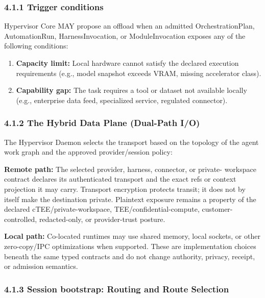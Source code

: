 \documentclass[
  11pt,
]{article}
\providecommand{\tightlist}{%
  \setlength{\itemsep}{0pt}\setlength{\parskip}{0pt}}
\begin{document}
\hypertarget{trigger-conditions}{%
\subsubsection{4.1.1 Trigger conditions}\label{trigger-conditions}}

Hypervisor Core MAY propose an offload when an admitted OrchestrationPlan,
AutomationRun, HarnessInvocation, or ModuleInvocation exposes any of the
following conditions:

\begin{enumerate}
\def\labelenumi{\arabic{enumi}.}
\tightlist
\item
  \textbf{Capacity limit:} Local hardware cannot satisfy the declared
  execution requirements (e.g., model snapshot exceeds VRAM, missing
  accelerator class).
\item
  \textbf{Capability gap:} The task requires a tool or dataset not
  available locally (e.g., enterprise data feed, specialized service,
  regulated connector).
\end{enumerate}

\hypertarget{the-hybrid-data-plane-dual-path-io}{%
\subsubsection{4.1.2 The Hybrid Data Plane (Dual-Path
I/O)}\label{the-hybrid-data-plane-dual-path-io}}

The Hypervisor Daemon selects the transport based on the topology of the
agent work graph and the approved provider/session policy:

\textbf{Remote path:} The selected provider, harness, connector, or private-
workspace contract declares its authenticated transport and the exact refs or
context projection it may carry. Transport encryption protects transit; it
does not by itself make the destination private. Plaintext exposure remains a
property of the declared cTEE/private-workspace, TEE/confidential-compute,
customer-controlled, redacted-only, or provider-trust posture.

\textbf{Local path:} Co-located runtimes may use shared memory, local sockets,
or other zero-copy/IPC optimizations when supported. These are implementation
choices beneath the same typed contracts and do not change authority,
privacy, receipt, or admission semantics.

\hypertarget{session-bootstrap-routing-and-route-selection}{%
\subsubsection{4.1.3 Session bootstrap: Routing and Route
Selection}\label{session-bootstrap-routing-and-route-selection}}
\end{document}
